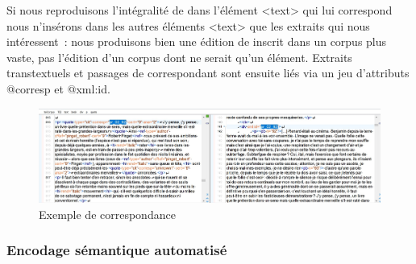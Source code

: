 \documentclass[12pt, a4paper]{article}
\begin{document}
Si nous reproduisons l'intégralité de \punr{} dans l'élément <text> qui lui correspond nous n'insérons dans les autres éléments <text> que les extraits qui nous intéressent~: nous produisons bien une édition de \punr{} inscrit dans un corpus plus vaste, pas l'édition d'un corpus dont \punr{} ne serait qu'un élément. Extraits transtextuels et passages de \punr{} correspondant sont ensuite liés via un jeu d'attributs @corresp et @xml\NoAutoSpaceBeforeFDP:id.
\begin{figure}[H]
    \centering
    \includegraphics[scale=0.5]{img/screen_corresp.jpg}
    \caption{Exemple de correspondance}
    \label{fig:screen_corresp}
\end{figure}
\subsubsection{Encodage sémantique automatisé}
\end{document}
